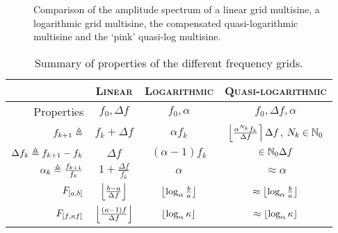   \begin{figure}[ht]
    \centering
      \setlength{}
      \setlength\figureheight{0.5\figurewidth}
    
    \caption[Amplitude spectrum for linear, logarithmic, quasi-logarithmic grids.]{Comparison of the amplitude spectrum of a linear grid multisine, a logarithmic grid multisine, the compensated quasi-logarithmic multisine and the `pink' quasi-log multisine.}%
    \label{fig:excitation:freqGrids}
  \end{figure}

  \begin{table}
  \centering
   \caption{Summary of  properties of the different frequency grids.}
    \begin{tabular}{rccc} 
    \toprule
     & \textsc{Linear} & \textsc{Logarithmic} & \textsc{Quasi-logarithmic} \\
    \midrule
    Properties 
       & $f_0, \Delta f$ 
       & $f_0, \alpha$ 
       & $f_0, \Delta f, \alpha$\\
    \midrule
    $f_{k+1} \triangleq$ 
       & $f_{k} + \Delta f$ 
       & $\alpha f_{k}$
       & $\left\lfloor \frac{\alpha^{N_k} f_k}{\Delta f} \right\rceil \Delta f$,   $N_k \in \mathbb{N}_{0}$
       \\[5pt]
    $\Delta f_k \triangleq f_{k+1} - f_k$ 
       & $\Delta f$
       & $(\alpha - 1) f_k$
       & $ \in \mathbb{N}_{0} \Delta f$ \\[5pt]
    $\alpha_k \triangleq \frac{f_{k+1}}{f_k}$ 
       & $1 + \frac{\Delta f}{f_k}$ 
       & $\alpha$ 
       & $\approx \alpha $ \\[5pt]
    $F_{\left[ a,b \right]}$
       & $\left\lfloor \frac{b - a}{\Delta f} \right\rfloor$
       & $\left\lfloor \log_{\alpha} \frac{b}{a} \right\rfloor$
       & $\approx \left\lfloor \log_{\alpha} \frac{b}{a} \right\rfloor$\\[5pt]
    $F_{\left[ f, \kappa f \right]}$
      & $\left\lfloor \frac{(\kappa - 1)f}{\Delta f} \right\rfloor$
      & $\left\lfloor \log_{\alpha} \kappa \right\rfloor$
      & $\approx \left\lfloor \log_{\alpha} \kappa \right\rfloor$\\[5pt]
    \bottomrule
    \end{tabular}
  \end{table}


